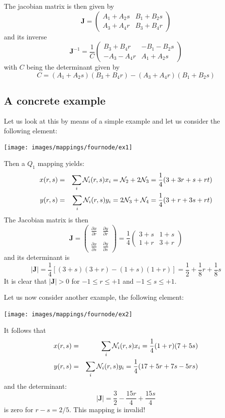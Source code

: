 The jacobian matrix is then given by
\[
{\bm J} = \left(
\begin{array}{cc}
A_1 + A_2s & B_1 + B_2s \\
A_3 + A_4r & B_3 + B_4r
\end{array}
\right)
\]
and its inverse
\[
{\bm J}^{-1} = \frac{1}{C}
\left(
\begin{array}{cc}
B_3 + B_4r & -B_1 - B_2s \\
-A_3 - A_4r & A_1 + A_2s
\end{array}
\right)
\]
with $C$ being the determinant given by
\[
C= (A_1 + A_2s)(B_3 + B_4r)-(A_3 + A_4r)(B_1 + B_2s)
\]


\subsection{A concrete example}

Let us look at this by means of a simple example and let us consider the following 
element:
\begin{center}
\texttt{[image: images/mappings/fournode/ex1]}
\end{center}
Then a $Q_1$ mapping yields:
\begin{eqnarray}
x(r,s) &=& \sum_i {\mathcal{N}}_i(r,s) x_i = {\mathcal{N}}_2 + 2{\mathcal{N}}_3 = \frac{1}{4} (3+3r+ s+rt) \nonumber\\
y(r,s) &=& \sum_i {\mathcal{N}}_i(r,s) y_i = 2{\mathcal{N}}_3 + {\mathcal{N}}_4 = \frac{1}{4} (3+r+ 3s+rt) 
\end{eqnarray}
The Jacobian matrix is then
\begin{equation}
{\bm J} = 
\left(
\begin{array}{cc}
\frac{\partial x}{\partial r} & \frac{\partial y}{\partial r} \nonumber\\ \\
\frac{\partial x}{\partial s} & \frac{\partial y}{\partial s} \nonumber
\end{array}
\right)
=
\frac{1}{4}
\left(
\begin{array}{cc}
3+s & 1+s \\
1+r & 3+r
\end{array}
\right)
\end{equation}
and its determinant is 
\begin{equation}
|{\bm J}|=\frac{1}{4} [(3+s)(3+r)-(1+s)(1+r)]=\frac{1}{2}+\frac{1}{8}r+\frac{1}{8}s
\end{equation}
It is clear that $|{\bm J}|>0$ for $-1\leq r \leq +1$ and $-1\leq s \leq +1$. 

Let us now consider another example, the following element:
\begin{center}
\texttt{[image: images/mappings/fournode/ex2]}
\end{center}
It follows that
\begin{eqnarray}
x(r,s) &=& \sum_i {\mathcal{N}}_i(r,s) x_i = \frac{1}{4}(1+r)(7+5s) \\ 
y(r,s) &=& \sum_i {\mathcal{N}}_i(r,s) y_i = \frac{1}{4}(17+5r+7s-5rs)
\end{eqnarray}
and the determinant:
\[
|{\bm J}|=\frac{3}{2}-\frac{15r}{4}+\frac{15s}{4}
\]
is zero for $r-s=2/5$. This mapping is invalid!



